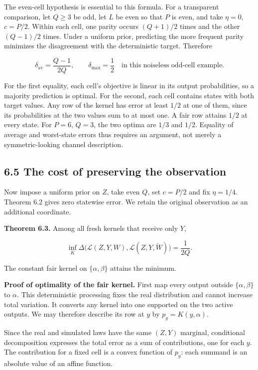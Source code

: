\documentclass[
]{article}
\begin{document}
The even-cell hypothesis is essential to this formula. For a transparent
comparison, let \(Q\ge3\) be odd, let \(L\) be even so that \(P\) is
even, and take \(\eta=0\), \(c=P/2\). Within each cell, one parity
occurs \((Q+1)/2\) times and the other \((Q-1)/2\) times. Under a
uniform prior, predicting the more frequent parity minimizes the
disagreement with the deterministic target. Therefore

\[
\delta_{\mathrm{av}}=\frac{Q-1}{2Q},
\qquad \delta_{\max}=\frac12
\quad\text{in this noiseless odd-cell example}.
\]

For the first equality, each cell's objective is linear in its output
probabilities, so a majority prediction is optimal. For the second, each
cell contains states with both target values. Any row of the kernel has
error at least \(1/2\) at one of them, since its probabilities at the
two values sum to at most one. A fair row attains \(1/2\) at every
state. For \(P=6\), \(Q=3\), the two optima are \(1/3\) and \(1/2\).
Equality of average and worst-state errors thus requires an argument,
not merely a symmetric-looking channel description.

\subsection{6.5 The cost of preserving the
observation}\label{the-cost-of-preserving-the-observation}

Now impose a uniform prior on \(Z\), take even \(Q\), set \(c=P/2\) and
fix \(\eta=1/4\). Theorem 6.2 gives zero statewise error. We retain the
original observation as an additional coordinate.

\textbf{Theorem 6.3.} Among all fresh kernels that receive only \(Y\),

\[
\inf_K\Delta\bigl(\mathcal L(Z,Y,W),\mathcal L(Z,Y,\widetilde W)\bigr)
=\frac1{2Q}.
\]

The constant fair kernel on \(\{\alpha,\beta\}\) attains the minimum.

\textbf{Proof of optimality of the fair kernel.} First map every output
outside \(\{\alpha,\beta\}\) to \(\alpha\). This deterministic
processing fixes the real distribution and cannot increase total
variation. It converts any kernel into one supported on the two active
outputs. We may therefore describe its row at \(y\) by
\(p_y=K(y,\alpha)\).

Since the real and simulated laws have the same \((Z,Y)\) marginal,
conditional decomposition expresses the total error as a sum of
contributions, one for each \(y\). The contribution for a fixed cell is
a convex function of \(p_y\): each summand is an absolute value of an
affine function.
\end{document}
